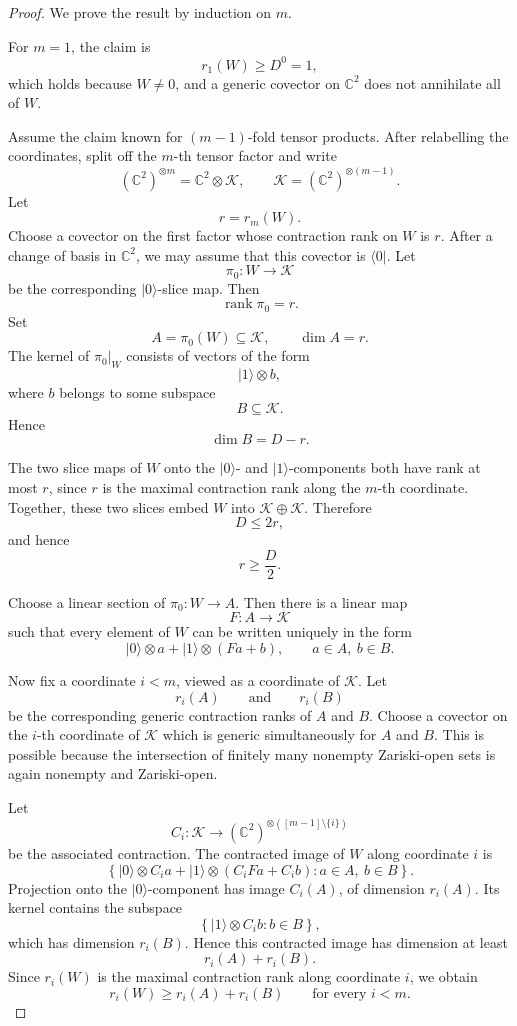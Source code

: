 \documentclass[11pt]{article}
\DeclareMathOperator{\rank}{rank}
\begin{document}
\begin{proof}
	We prove the result by induction on \(m\).
	
	For \(m=1\), the claim is
	\[
	r_1(W)\geq D^0=1,
	\]
	which holds because \(W\neq0\), and a generic covector on \(\mathbb C^2\)
	does not annihilate all of \(W\).
	
	Assume the claim known for \((m-1)\)-fold tensor products.  After relabelling
	the coordinates, split off the \(m\)-th tensor factor and write
	\[
	(\mathbb C^2)^{\otimes m}
	=
	\mathbb C^2\otimes\mathcal K,
	\qquad
	\mathcal K=(\mathbb C^2)^{\otimes(m-1)}.
	\]
	Let
	\[
	r=r_m(W).
	\]
	Choose a covector on the first factor whose contraction rank on \(W\) is \(r\).
	After a change of basis in \(\mathbb C^2\), we may assume that this covector
	is \(\langle0|\).  Let
	\[
	\pi_0:W\to\mathcal K
	\]
	be the corresponding \(|0\rangle\)-slice map.  Then
	\[
	\rank \pi_0=r.
	\]
	Set
	\[
	A=\pi_0(W)\subseteq\mathcal K,
	\qquad
	\dim A=r.
	\]
	The kernel of \(\pi_0|_W\) consists of vectors of the form
	\[
	|1\rangle\otimes b,
	\]
	where \(b\) belongs to some subspace
	\[
	B\subseteq\mathcal K.
	\]
	Hence
	\[
	\dim B=D-r.
	\]
	
	The two slice maps of \(W\) onto the \(|0\rangle\)- and
	\(|1\rangle\)-components both have rank at most \(r\), since \(r\) is the
	maximal contraction rank along the \(m\)-th coordinate.  Together, these two
	slices embed \(W\) into \(\mathcal K\oplus\mathcal K\).  Therefore
	\[
	D\leq 2r,
	\]
	and hence
	\[
	r\geq \frac D2.
	\]
	
	Choose a linear section of \(\pi_0:W\to A\).  Then there is a linear map
	\[
	F:A\to\mathcal K
	\]
	such that every element of \(W\) can be written uniquely in the form
	\[
	|0\rangle\otimes a
	+
	|1\rangle\otimes(Fa+b),
	\qquad
	a\in A,\ b\in B.
	\]
	
	Now fix a coordinate \(i<m\), viewed as a coordinate of \(\mathcal K\).  Let
	\[
	r_i(A)
	\qquad\text{and}\qquad
	r_i(B)
	\]
	be the corresponding generic contraction ranks of \(A\) and \(B\).  Choose a
	covector on the \(i\)-th coordinate of \(\mathcal K\) which is generic
	simultaneously for \(A\) and \(B\).  This is possible because the intersection
	of finitely many nonempty Zariski-open sets is again nonempty and Zariski-open.
	
	Let
	\[
	C_i:\mathcal K\to(\mathbb C^2)^{\otimes([m-1]\setminus\{i\})}
	\]
	be the associated contraction.  The contracted image of \(W\) along coordinate
	\(i\) is
	\[
	\left\{
	|0\rangle\otimes C_i a
	+
	|1\rangle\otimes(C_iFa+C_i b)
	:
	a\in A,\ b\in B
	\right\}.
	\]
	Projection onto the \(|0\rangle\)-component has image \(C_i(A)\), of dimension
	\(r_i(A)\).  Its kernel contains the subspace
	\[
	\left\{
	|1\rangle\otimes C_i b:b\in B
	\right\},
	\]
	which has dimension \(r_i(B)\).  Hence this contracted image has dimension at
	least
	\[
	r_i(A)+r_i(B).
	\]
	Since \(r_i(W)\) is the maximal contraction rank along coordinate \(i\), we
	obtain
	\[
	r_i(W)\geq r_i(A)+r_i(B)
	\qquad\text{for every } i<m.
	\]
	

\end{proof}
\end{document}

